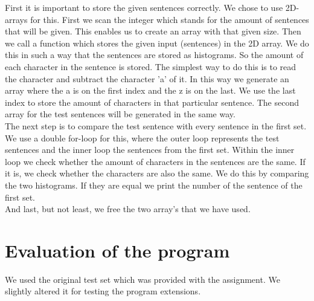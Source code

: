 \documentclass[a4paper]{article}
\begin{document}
First it is important to store the given sentences correctly. We chose to use 2D-arrays for this. First we scan the integer which stands for the amount of sentences that will be given. This enables us to create an array with that given size. Then we call a function which stores the given input (sentences) in the 2D array. We do this in such a way that the sentences are stored as histograms. So the amount of each character in the sentence is stored. The simplest way to do this is to read the character and subtract the character 'a' of it. In this way we generate an array where the a is on the first index and the z is on the last. We use the last index to store the amount of characters in that particular sentence. The second array for the test sentences will be generated in the same way.\\
The next step is to compare the test sentence with every sentence in the first set.
We use a double for-loop for this, where the outer loop represents the test sentences and the inner loop the sentences from the first set. Within the inner loop we check whether the amount of characters in the sentences are the same. If it is, we check whether the characters are also the same. We do this by comparing the two histograms. If they are equal we print the number of the sentence of the first set.\\
And last, but not least, we free the two array's that we have used.

\newpage

\section{Evaluation of the program}

We used the original test set which was provided with the assignment. We slightly altered it for testing the program extensions.
\end{document}
